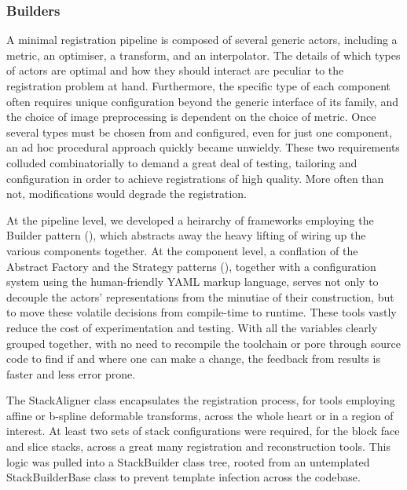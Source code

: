     \subsubsection{Builders} %
    \label{ssub:builders}
      A minimal registration pipeline is composed of several generic actors, including a metric, an optimiser, a transform, and an interpolator. The details of which types of actors are optimal and how they should interact are peculiar to the registration problem at hand. Furthermore, the specific type of each component often requires unique configuration beyond the generic interface of its family, and the choice of image preprocessing is dependent on the choice of metric. Once several types must be chosen from and configured, even for just one component, an ad hoc procedural approach quickly became unwieldy. These two requirements colluded combinatorially to demand a great deal of testing, tailoring and configuration in order to achieve registrations of high quality. More often than not, modifications would degrade the registration.
			
      At the pipeline level, we developed a heirarchy of frameworks employing the Builder pattern (\cite{Gamma1995}), which abstracts away the heavy lifting of wiring up the various components together.  At the component level, a conflation of the Abstract Factory and the Strategy patterns (\cite{Gamma1995}), together with a configuration system using the human-friendly YAML markup language, serves not only to decouple the actors' representations from the minutiae of their construction, but to move these volatile decisions from compile-time to runtime. These tools vastly reduce the cost of experimentation and testing. With all the variables clearly grouped together, with no need to recompile the toolchain or pore through source code to find if and where one can make a change, the feedback from results is faster and less error prone.
      
			The StackAligner class encapsulates the registration process, for tools employing affine or b-spline deformable transforms, across the whole heart or in a region of interest. At least two sets of stack configurations were required, for the block face and slice stacks, across a great many registration and reconstruction tools. This logic was pulled into a StackBuilder class tree, rooted from an untemplated StackBuilderBase class to prevent template infection across the codebase.
		
